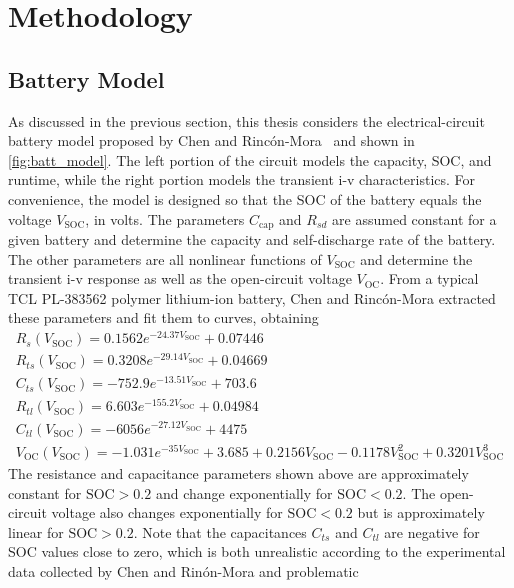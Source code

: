 \documentclass[../zhang_thesis.tex]{subfiles}
\begin{document}
\chapter{Methodology}


\section{Battery Model}

As discussed in the previous section, this thesis considers the electrical-circuit battery model proposed by Chen and Rinc\'on-Mora~\cite{chen06} and shown in \autoref{fig:batt_model}. The left portion of the circuit models the capacity, SOC, and runtime, while the right portion models the transient i-v characteristics.  For convenience, the model is designed so that the SOC of the battery equals the voltage $V_\text{SOC}$, in volts. The parameters $C_\text{cap}$ and
$R_{sd}$ are assumed constant for a given battery and determine the capacity and self-discharge rate of the battery. The other parameters are all nonlinear functions of $V_\text{SOC}$ and determine the transient i-v response as well as the open-circuit voltage $V_\text{OC}$. From a typical TCL PL-383562 polymer lithium-ion battery, Chen and Rinc\'on-Mora extracted these parameters and fit them to curves, obtaining
\begin{gather}
    R_s(V_\text{SOC}) = 0.1562 e^{-24.37 V_\text{SOC}} + 0.07446 \label{eq:nl_param_1} \\
    R_{ts}(V_\text{SOC}) = 0.3208 e^{-29.14 V_\text{SOC}} + 0.04669 \\
    C_{ts}(V_\text{SOC}) = -752.9 e^{-13.51 V_\text{SOC}} + 703.6 \\
    R_{tl}(V_\text{SOC}) = 6.603 e^{-155.2 V_\text{SOC}} + 0.04984 \\
    C_{tl}(V_\text{SOC}) = -6056 e^{-27.12 V_\text{SOC}} + 4475 \\
    V_\text{OC}(V_\text{SOC}) = -1.031 e^{-35 V_\text{SOC}} + 3.685 + 0.2156 V_\text{SOC} - 0.1178 V_\text{SOC}^2 + 0.3201 V_\text{SOC}^3 \label{eq:nl_param_6}
\end{gather}
The resistance and capacitance parameters shown above are approximately constant for $\text{SOC}>0.2$ and change exponentially for $\text{SOC}<0.2$. The open-circuit voltage also changes exponentially for $\text{SOC}<0.2$ but is approximately linear for $\text{SOC}>0.2$. Note that the capacitances $C_{ts}$ and $C_{tl}$ are negative for SOC values close to zero, which is both unrealistic according to the experimental data collected by Chen and Rin\'on-Mora and problematic
\end{document}
